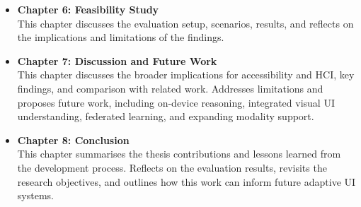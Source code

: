 \begin{itemize}
    \item \textbf{Chapter 6: Feasibility Study} \\
    This chapter discusses the evaluation setup, scenarios, results, and reflects on the implications and limitations of the findings.
    \item \textbf{Chapter 7: Discussion and Future Work} \\
    This chapter discusses the broader implications for accessibility and HCI, key findings, and comparison with related work. Addresses limitations and proposes future work, including on-device reasoning, integrated visual UI understanding, federated learning, and expanding modality support.
    \item \textbf{Chapter 8: Conclusion} \\
    This chapter summarises the thesis contributions and lessons learned from the development process. Reflects on the evaluation results, revisits the research objectives, and outlines how this work can inform future adaptive UI systems.
\end{itemize}
